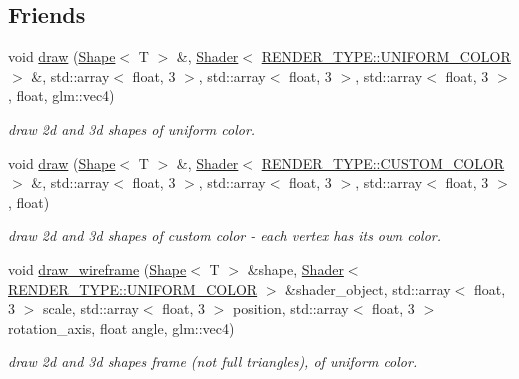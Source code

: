 \subsection*{Friends}
\begin{DoxyCompactItemize}
\item 
void \mbox{\hyperlink{classShape_a0f7d9c8330ae4f062c6f569a7400e1f0}{draw}} (\mbox{\hyperlink{classShape}{Shape}}$<$ T $>$ \&, \mbox{\hyperlink{classShader}{Shader}}$<$ \mbox{\hyperlink{shader__class_8hpp_a24e288e18eb7b6e01de7565001fedb60aa98862073f71a928bad5099cc3e1c2ed}{R\+E\+N\+D\+E\+R\+\_\+\+T\+Y\+P\+E\+::\+U\+N\+I\+F\+O\+R\+M\+\_\+\+C\+O\+L\+OR}} $>$ \&, std\+::array$<$ float, 3 $>$, std\+::array$<$ float, 3 $>$, std\+::array$<$ float, 3 $>$, float, glm\+::vec4)
\begin{DoxyCompactList}\small\item\em draw 2d and 3d shapes of uniform color. \end{DoxyCompactList}\item 
void \mbox{\hyperlink{classShape_a29e514c040e0781bfa2e08bcde4a7557}{draw}} (\mbox{\hyperlink{classShape}{Shape}}$<$ T $>$ \&, \mbox{\hyperlink{classShader}{Shader}}$<$ \mbox{\hyperlink{shader__class_8hpp_a24e288e18eb7b6e01de7565001fedb60a9d34355b5a26c54b5dbab1e45245a6f4}{R\+E\+N\+D\+E\+R\+\_\+\+T\+Y\+P\+E\+::\+C\+U\+S\+T\+O\+M\+\_\+\+C\+O\+L\+OR}} $>$ \&, std\+::array$<$ float, 3 $>$, std\+::array$<$ float, 3 $>$, std\+::array$<$ float, 3 $>$, float)
\begin{DoxyCompactList}\small\item\em draw 2d and 3d shapes of custom color -\/ each vertex has it\textquotesingle{}s own color. \end{DoxyCompactList}\item 
void \mbox{\hyperlink{classShape_ad57e4dd441b60269c43114f31ffa6085}{draw\+\_\+wireframe}} (\mbox{\hyperlink{classShape}{Shape}}$<$ T $>$ \&shape, \mbox{\hyperlink{classShader}{Shader}}$<$ \mbox{\hyperlink{shader__class_8hpp_a24e288e18eb7b6e01de7565001fedb60aa98862073f71a928bad5099cc3e1c2ed}{R\+E\+N\+D\+E\+R\+\_\+\+T\+Y\+P\+E\+::\+U\+N\+I\+F\+O\+R\+M\+\_\+\+C\+O\+L\+OR}} $>$ \&shader\+\_\+object, std\+::array$<$ float, 3 $>$ scale, std\+::array$<$ float, 3 $>$ position, std\+::array$<$ float, 3 $>$ rotation\+\_\+axis, float angle, glm\+::vec4)
\begin{DoxyCompactList}\small\item\em draw 2d and 3d shapes frame (not full triangles), of uniform color. \end{DoxyCompactList}\end{DoxyCompactItemize}


